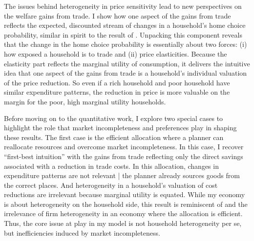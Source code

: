 \documentclass[12pt,pdftex]{article}
\begin{document}
\begin{onehalfspacing}
The issues behind heterogeneity in price sensitivity lead to new perspectives on the welfare gains from trade. I show how one aspect of the gains from trade reflects the expected, discounted stream of changes in a household's home choice probability, similar in spirit to the result of \citet{arkolakis2012new}. Unpacking this component reveals that the change in the home choice probability is essentially about two forces: (i) how exposed a household is to trade and (ii) price elasticities. Because the elasticity part reflects the marginal utility of consumption, it delivers the intuitive idea that one aspect of the gains from trade is a household's individual valuation of the price reduction. So even if a rich household and poor household have similar expenditure patterns, the reduction in price is more valuable on the margin for the poor, high marginal utility households.

Before moving on to the quantitative work, I explore two special cases to highlight the role that market incompleteness and preferences play in shaping these results. The first case is the efficient allocation where a planner can reallocate resources and overcome market incompleteness. In this case, I recover ``first-best intuition'' with the gains from trade reflecting only the direct savings associated with a reduction in trade costs. In this allocation, changes in expenditure patterns are not relevant | the planner already sources goods from the correct places. And heterogeneity in a household's valuation of cost reductions are irrelevant because marginal utility is equated. While my economy is about heterogeneity on the household side, this result is reminiscent of \citet{AtkesonBurstein2010} and the irrelevance of firm heterogeneity in an economy where the allocation is efficient. Thus, the core issue at play in my model is not household heterogeneity per se, but inefficiencies induced by market incompleteness.


\end{onehalfspacing}
\end{document}
